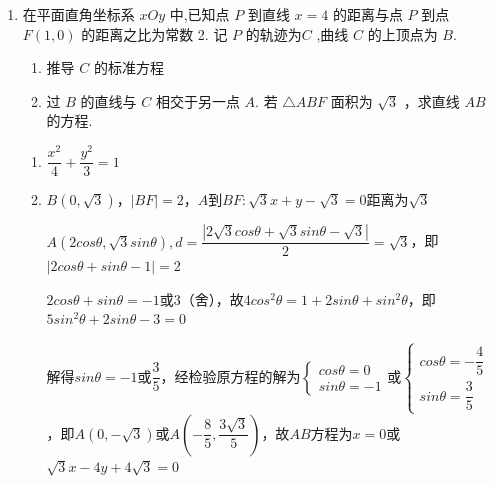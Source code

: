 \begin{enumerate}
\begin{enumerate}
        \item 在平面直角坐标系 ${xOy}$ 中,已知点 $P$ 到直线 $x = 4$ 的距离与点 $P$ 到点 $F\left( {1,0}\right)$ 的距离之比为常数 2. 记 $P$ 的轨迹为$C$ ,曲线 $C$ 的上顶点为 $B$.
        \begin{enumerate}
            \item 推导 $C$ 的标准方程
            \item 过 $B$ 的直线与 $C$ 相交于另一点 $A$. 若 $\bigtriangleup {ABF}$ 面积为 $\sqrt{3}$ ，求直线 ${AB}$ 的方程.
        \end{enumerate}
        \begin{jieda}
            \begin{enumerate}
                \item $\dfrac{x^2}{4}+\dfrac{y^2}{3} = 1$
                \item $B(0, \sqrt{3})$，$|BF| = 2$，$A$到$BF: \sqrt{3}x+y-\sqrt{3} = 0$距离为$\sqrt{3}$
                
                $A(2cos\theta, \sqrt{3}sin\theta), d = \dfrac{|2\sqrt{3}cos\theta+\sqrt{3}sin\theta-\sqrt{3}|}{2} = \sqrt{3}$，即$|2cos\theta+sin\theta-1| = 2$

                $2cos\theta+sin\theta = -1$或$3$（舍），故$4cos^2\theta = 1+2sin\theta+sin^2\theta$，即$5sin^2\theta + 2sin\theta -3 = 0$

                解得$sin\theta = -1$或$\dfrac{3}{5}$，经检验原方程的解为$\left\{\begin{array}{l}
                    cos\theta = 0 \\
                    sin\theta = -1
                \end{array} \right.$或$\left\{\begin{array}{l}
                    cos\theta = -\dfrac{4}{5} \\
                    sin\theta = \dfrac{3}{5}
                \end{array} \right.$，即$A(0, -\sqrt{3})$或$A\left(-\dfrac{8}{5}, \dfrac{3\sqrt{3}}{5}\right)$，故$AB$方程为$x = 0$或$\sqrt{3}x - 4y + 4\sqrt{3} =0$
            \end{enumerate}
        \end{jieda}


\end{enumerate}
\end{enumerate}
